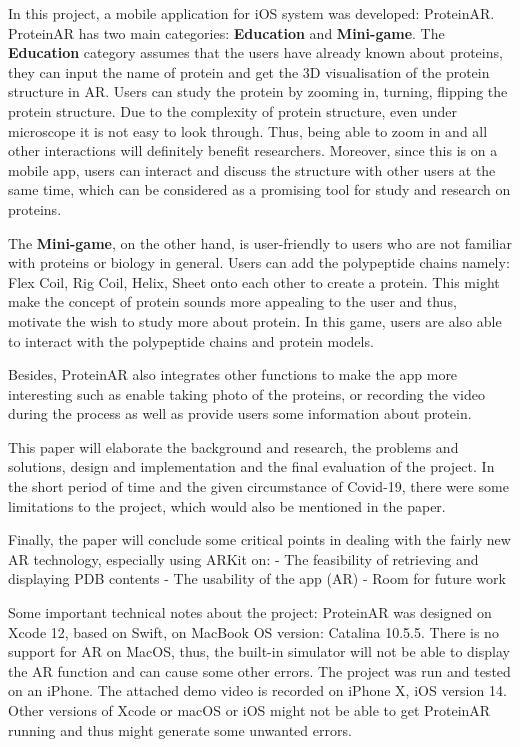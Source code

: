 In this project, a mobile application for iOS system was developed: ProteinAR. ProteinAR has two main categories: \textbf{Education} and \textbf{Mini-game}. 
The \textbf{Education} category assumes that the users have already known about proteins, they can input the name of protein and get the 3D visualisation of the protein structure in AR. Users can study the protein by zooming in, turning, flipping the protein structure. Due to the complexity of protein structure, even under microscope it is not easy to look through. Thus, being able to zoom in and all other interactions will definitely benefit researchers. Moreover, since this is on a mobile app, users can interact and discuss the structure with other users at the same time, which can be considered as a promising tool for study and research on proteins.

The \textbf{Mini-game}, on the other hand, is user-friendly to users who are not familiar with proteins or biology in general. Users can add the polypeptide chains namely: Flex Coil, Rig Coil, Helix, Sheet onto each other to create a protein. This might make the concept of protein sounds more appealing to the user and thus, motivate the wish to study more about protein. In this game, users are also able to interact with the polypeptide chains and protein models. 

Besides, ProteinAR also integrates other functions to make the app more interesting such as enable taking photo of the proteins, or recording the video during the process as well as provide users some information about protein.

This paper will elaborate the background and research, the problems and solutions, design and implementation and the final evaluation of the project. In the short period of time and the given circumstance of Covid-19, there were some limitations to the project, which would also be mentioned in the paper. 

Finally, the paper will conclude some critical points in dealing with the fairly new AR technology, especially using ARKit on:
- The feasibility of retrieving and displaying PDB contents
- The usability of the app (AR)
- Room for future work

Some important technical notes about the project:
ProteinAR was designed on Xcode 12, based on Swift, on MacBook OS version: Catalina 10.5.5. There is no support for AR on MacOS, thus, the built-in simulator will not be able to display the AR function and can cause some other errors. The project was run and tested on an iPhone. The attached demo video is recorded on iPhone X, iOS version 14. Other versions of Xcode or macOS or iOS might not be able to get ProteinAR running and thus might generate some unwanted errors. 

